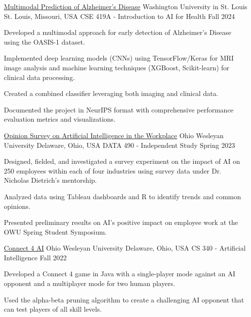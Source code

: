 \documentclass[10pt, letterpaper]{article}
\begin{document}
\begin{researchentry}
    {\href{https://github.com/agopalareddy/CSE419A_Multimodal_Prediction_of_Alzheimers}{Multimodal Prediction of Alzheimer's Disease}} %
    {Washington University in St. Louis} %
    {St. Louis, Missouri, USA} %
    {CSE 419A - Introduction to AI for Health} %
    {Fall 2024} %
    \item Developed a multimodal approach for early detection of Alzheimer's Disease using the OASIS-1 dataset.
    \item Implemented deep learning models (CNNs) using TensorFlow/Keras for MRI image analysis and machine learning techniques (XGBoost, Scikit-learn) for clinical data processing.
    \item Created a combined classifier leveraging both imaging and clinical data.
    \item Documented the project in NeurIPS format with comprehensive performance evaluation metrics and visualizations.
\end{researchentry}

\begin{researchentry}
    {\href{https://github.com/agopalareddy/DATA490}{Opinion Survey on Artificial Intelligence in the Workplace}} %
    {Ohio Wesleyan University} %
    {Delaware, Ohio, USA} %
    {DATA 490 - Independent Study} %
    {Spring 2023} %
    \item Designed, fielded, and investigated a survey experiment on the impact of AI on 250 employees within each of four industries using survey data under Dr. Nicholas Dietrich's mentorship.
    \item Analyzed data using Tableau dashboards and R to identify trends and common opinions.
    \item Presented preliminary results on AI's positive impact on employee work at the OWU Spring Student Symposium.
\end{researchentry}

\begin{researchentry}
    {\href{https://github.com/agopalareddy/CS340Final-Connect4}{Connect 4 AI}} %
    {Ohio Wesleyan University} %
    {Delaware, Ohio, USA} %
    {CS 340 - Artificial Intelligence} %
    {Fall 2022} %
    \item Developed a Connect 4 game in Java with a single-player mode against an AI opponent and a multiplayer mode for two human players.
    \item Used the alpha-beta pruning algorithm to create a challenging AI opponent that can test players of all skill levels.
\end{researchentry}
\end{document}
